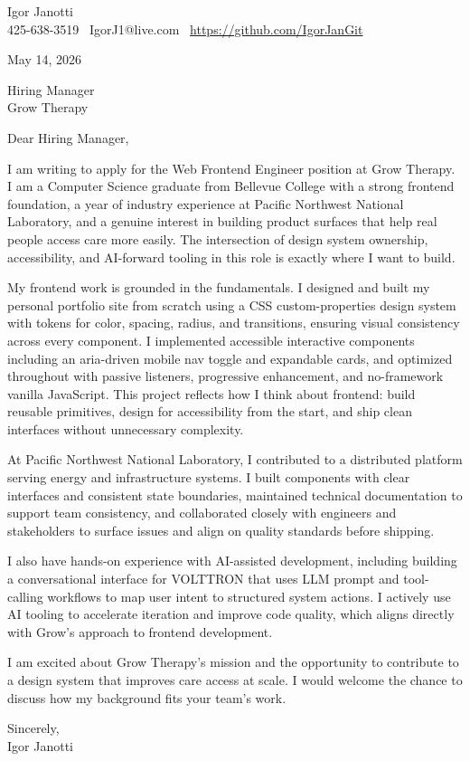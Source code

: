 \documentclass[11pt]{article}
\begin{document}
Igor Janotti\\
425-638-3519 \textbar\ IgorJ1@live.com \textbar\ \url{https://github.com/IgorJanGit}

May 14, 2026

Hiring Manager\\
Grow Therapy

Dear Hiring Manager,

I am writing to apply for the Web Frontend Engineer position at Grow Therapy. I am a Computer Science graduate from Bellevue College with a strong frontend foundation, a year of industry experience at Pacific Northwest National Laboratory, and a genuine interest in building product surfaces that help real people access care more easily. The intersection of design system ownership, accessibility, and AI-forward tooling in this role is exactly where I want to build.

My frontend work is grounded in the fundamentals. I designed and built my personal portfolio site from scratch using a CSS custom-properties design system with tokens for color, spacing, radius, and transitions, ensuring visual consistency across every component. I implemented accessible interactive components including an aria-driven mobile nav toggle and expandable cards, and optimized throughout with passive listeners, progressive enhancement, and no-framework vanilla JavaScript. This project reflects how I think about frontend: build reusable primitives, design for accessibility from the start, and ship clean interfaces without unnecessary complexity.

At Pacific Northwest National Laboratory, I contributed to a distributed platform serving energy and infrastructure systems. I built components with clear interfaces and consistent state boundaries, maintained technical documentation to support team consistency, and collaborated closely with engineers and stakeholders to surface issues and align on quality standards before shipping.

I also have hands-on experience with AI-assisted development, including building a conversational interface for VOLTTRON that uses LLM prompt and tool-calling workflows to map user intent to structured system actions. I actively use AI tooling to accelerate iteration and improve code quality, which aligns directly with Grow's approach to frontend development.

I am excited about Grow Therapy's mission and the opportunity to contribute to a design system that improves care access at scale. I would welcome the chance to discuss how my background fits your team's work.

Sincerely,\\
Igor Janotti
\end{document}
